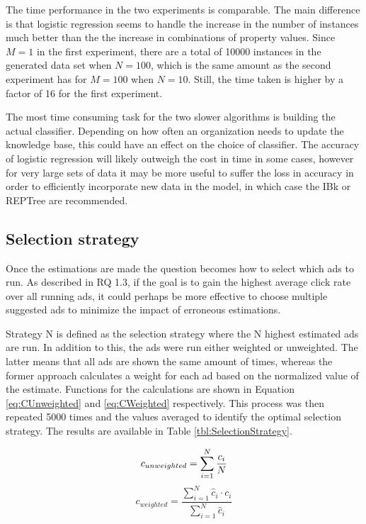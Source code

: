 \documentclass{sig-alternate}
\begin{document}
The time performance in the two experiments is comparable. The main difference is that logistic regression seems to handle the increase in the number of instances much better than the the increase in combinations of property values. Since \(M=1\) in the first experiment, there are a total of 10000 instances in the generated data set when \(N=100\), which is the same amount as the second experiment has for \(M=100\) when \(N=10\). Still, the time taken is higher by a factor of 16 for the first experiment.

The most time consuming task for the two slower algorithms is building the actual classifier. Depending on how often an organization needs to update the knowledge base, this could have an effect on the choice of classifier. The accuracy of logistic regression will likely outweigh the cost in time in some cases, however for very large sets of data it may be more useful to suffer the loss in accuracy in order to efficiently incorporate new data in the model, in which case the IBk or REPTree are recommended.

\subsection{Selection strategy}
Once the estimations are made the question becomes how to select which ads to run. As described in RQ 1.3, if the goal is to gain the highest average click rate over all running ads, it could perhaps be more effective to choose multiple suggested ads to minimize the impact of erroneous estimations.

Strategy N is defined as the selection strategy where the N highest estimated ads are run. In addition to this, the ads were run either weighted or unweighted. The latter means that all ads are shown the same amount of times, whereas the former approach calculates a weight for each ad based on the normalized value of the estimate. Functions for the calculations are shown in Equation \ref{eq:CUnweighted} and \ref{eq:CWeighted} respectively. This process was then repeated 5000 times and the values averaged to identify the optimal selection strategy. The results are available in Table \ref{tbl:SelectionStrategy}.

\begin{equation}
	c_{unweighted} = \sum_{i=1}^{N} \frac{ c_i }{ N } \\
	\label{eq:CUnweighted}
\end{equation}
\begin{equation}
	c_{weighted} = \frac{ \sum_{i=1}^{N} \hat{c}_i \cdot c_i }{ \sum_{i=1}^{N} \hat{c}_i }
	\label{eq:CWeighted}
\end{equation}
\end{document}

